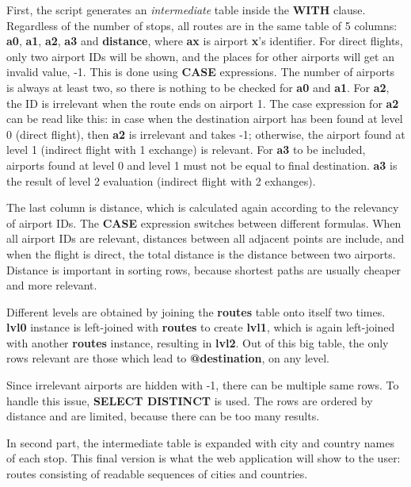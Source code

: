 \documentclass[12pt]{article}
\begin{document}
First, the script generates an \emph{intermediate} table inside the \textbf{WITH} clause. Regardless of the number of stops, all routes are in the same table of 5 columns: \textbf{a0}, \textbf{a1}, \textbf{a2}, \textbf{a3} and \textbf{distance}, where \textbf{ax} is airport \textbf{x}'s identifier. For direct flights, only two airport IDs will be shown, and the places for other airports will get an invalid value, -1. This is done using \textbf{CASE} expressions. The number of airports is always at least two, so there is nothing to be checked for \textbf{a0} and \textbf{a1}. For \textbf{a2}, the ID is irrelevant when the route ends on airport 1. The case expression for \textbf{a2} can be read like this: in case when the destination airport has been found at level 0 (direct flight), then \textbf{a2} is irrelevant and takes -1; otherwise, the airport found at level 1 (indirect flight with 1 exchange) is relevant. For \textbf{a3} to be included, airports found at level 0 and level 1 must not be equal to final destination. \textbf{a3} is the result of level 2 evaluation (indirect flight with 2 exhanges).

The last column is distance, which is calculated again according to the relevancy of airport IDs. The \textbf{CASE} expression switches between different formulas. When all airport IDs are relevant, distances between all adjacent points are include, and when the flight is direct, the total distance is the distance between two airports. Distance is important in sorting rows, because shortest paths are usually cheaper and more relevant.

Different levels are obtained by joining the \textbf{routes} table onto itself two times. \textbf{lvl0} instance is left-joined with \textbf{routes} to create \textbf{lvl1}, which is again left-joined with another \textbf{routes} instance, resulting in \textbf{lvl2}. Out of this big table, the only rows relevant are those which lead to \textbf{@destination}, on any level.

Since irrelevant airports are hidden with -1, there can be multiple same rows. To handle this issue, \textbf{SELECT DISTINCT} is used. The rows are ordered by distance and are limited, because there can be too many results.

In second part, the intermediate table is expanded with city and country names of each stop. This final version is what the web application will show to the user: routes consisting of readable sequences of cities and countries.
\end{document}
